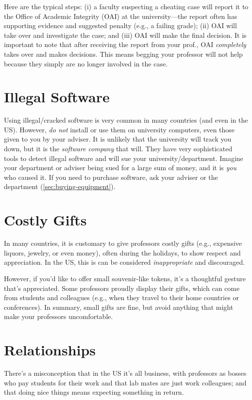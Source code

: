 \documentclass[oneside,11pt,dvipsnames]{book}
\begin{document}
Here are the typical steps: (i) a faculty suspecting a cheating case will report it to the Office of Academic Integrity (OAI) at the university---the report often has supporting evidence and suggested penalty (e.g., a failing grade);  (ii)  OAI will take over and investigate the case; and (iii) OAI will make the final decision.  It is important to note that after receiving the report from your prof., OAI \emph{completely} takes over and makes decisions.  This means begging your professor will not help because they simply are no longer involved in the case.

\section{Illegal Software} Using illegal/cracked software is very common in many countries (and even in the US). However, \emph{do not} install or use them on university computers, even those given to you by your adviser.  It is unlikely that the university will track you down, but it is the \emph{software company} that will.  They have very sophisticated tools to detect illegal software and will sue your university/department.  Imagine your department or adviser being sued for a large sum of money, and it is \emph{you} who caused it.  If you need to purchase software,  ask your adviser or the department (\autoref{sec:buying-equipment}).


\section{Costly Gifts}\label{sec:gifts} In many countries, it is customary to give professors costly gifts (e.g., expensive liquors, jewelry, or even money), often during the holidays, to show respect and appreciation.  In the US, this is can be considered \emph{inappropriate} and discouraged. 

However, if you'd like to offer small souvenir-like tokens, it's a thoughtful gesture that's appreciated. Some professors proudly display their gifts, which can come from students and colleagues (e.g., when they travel to their home countries or conferences). In summary, small gifts are fine, but avoid anything that might make your professors uncomfortable.


\section{Relationships}
There's a misconception that in the US it's all business, with professors as bosses who pay students for their work and that lab mates are just work colleagues; and that doing nice things means expecting something in return.
\end{document}
